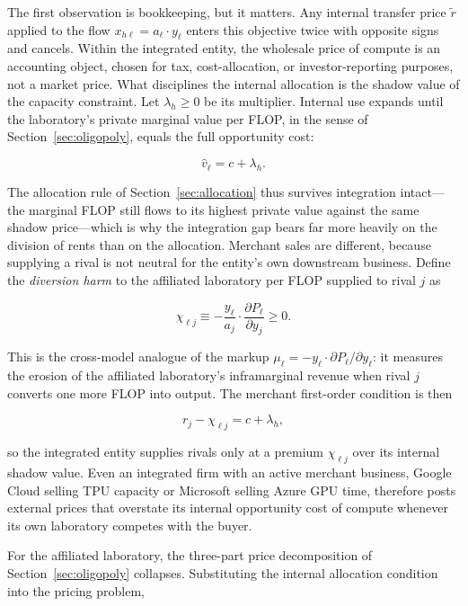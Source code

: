 \documentclass[11pt]{article}
\begin{document}
The first observation is bookkeeping, but it matters. Any internal transfer price $\tilde r$ applied to the flow $x_{h\ell}=a_\ell\cdot y_\ell$ enters this objective twice with opposite signs and cancels. Within the integrated entity, the wholesale price of compute is an accounting object, chosen for tax, cost-allocation, or investor-reporting purposes, not a market price. What disciplines the internal allocation is the shadow value of the capacity constraint. Let $\lambda_h\geq0$ be its multiplier. Internal use expands until the laboratory's private marginal value per FLOP, in the sense of Section~\ref{sec:oligopoly}, equals the full opportunity cost:

\begin{equation}\widehat v_\ell=c+\lambda_h.\end{equation}

The allocation rule of Section~\ref{sec:allocation} thus survives integration intact---the marginal FLOP still flows to its highest private value against the same shadow price---which is why the integration gap bears far more heavily on the division of rents than on the allocation. Merchant sales are different, because supplying a rival is not neutral for the entity's own downstream business. Define the \emph{diversion harm} to the affiliated laboratory per FLOP supplied to rival $j$ as

\begin{equation}\chi_{\ell j}\equiv-\frac{y_\ell}{a_j}\cdot\frac{\partial P_\ell}{\partial y_j}\geq0.\end{equation}

This is the cross-model analogue of the markup $\mu_\ell=-y_\ell\cdot\partial P_\ell/\partial y_\ell$: it measures the erosion of the affiliated laboratory's inframarginal revenue when rival $j$ converts one more FLOP into output. The merchant first-order condition is then

\begin{equation}r_j-\chi_{\ell j}=c+\lambda_h,\end{equation}

so the integrated entity supplies rivals only at a premium $\chi_{\ell j}$ over its internal shadow value. Even an integrated firm with an active merchant business, Google Cloud selling TPU capacity or Microsoft selling Azure GPU time, therefore posts external prices that overstate its internal opportunity cost of compute whenever its own laboratory competes with the buyer.

For the affiliated laboratory, the three-part price decomposition of Section~\ref{sec:oligopoly} collapses. Substituting the internal allocation condition into the pricing problem,
\end{document}
